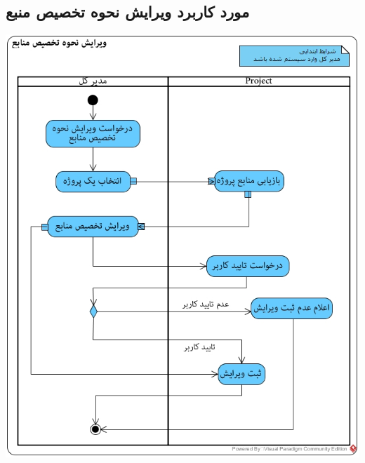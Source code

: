 \subsection*{مورد کاربرد ویرایش نحوه تخصیص منبع}
\vspace{2cm}
\begin{center}
\includegraphics[width=\textwidth]{ActivityDiagramsWithSwimlanes/37.jpg}
\end{center}

\newpage
\vspace{2cm}
